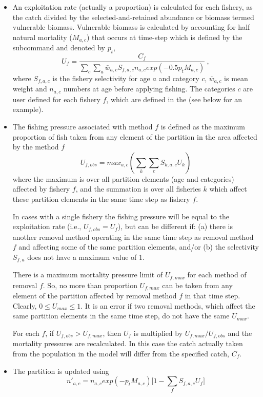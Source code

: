 \begin{itemize}
	\item An exploitation rate (actually a proportion) is calculated for each fishery, as the catch divided by the selected-and-retained abundance or biomass termed vulnerable biomass. Vulnerable biomass is calculated by accounting for half natural mortality (\(M_{a,c}\)) that occurs at time-step which is defined by the subcommand  and denoted by \(p_t\),
	$$U_{f} = \frac{C_f}{\sum\limits_{c}\sum\limits_a \bar{w}_{a,c} S_{f,a,c} n_{a,c} exp(-0.5 p_t M_{a,c})} \ ,$$
	where \(S_{f,a,c}\) is the fishery selectivity for age \(a\) and category \(c\), \(\bar{w}_{a,c}\) is mean weight and \(n_{a,c}\) numbers at age before applying fishing. The categories \(c\) are user defined for each fishery \(f\), which are defined in the  (see below for an example).
	\item The fishing pressure associated with method $f$ is defined as the maximum proportion of fish taken from any element of the partition in the area affected by the method $f$
	$$ U_{f,obs} = max_{a,c}(\sum\limits_k\sum\limits_c S_{k,a,c} U_k) $$
	where the maximum is over all partition elements (age and categories) affected by fishery $f$, and the summation is over all fisheries $k$ which affect these partition elements in the same time step as fishery $f$.

	In cases with a single fishery the fishing pressure will be equal to the exploitation rate (i.e., $U_{f,obs} = U_f$), but can be different if: (a) there is another removal method operating in the same time step as removal method $f$ and affecting some of the same partition elements, and/or (b) the selectivity $S_{f,a}$ does not have a maximum value of 1.

	There is a maximum mortality pressure limit of $U_{f,max}$ for each method of removal $f$. So, no more than proportion $U_{f,max}$ can be taken from any element of the partition affected by removal method $f$ in that time step. Clearly, $0 \leq U_{max} \leq 1$. It is an error if two removal methods, which affect the same partition elements in the same time step, do not have the same $U_{max}$.

	For each $f$, if $U_{f,obs} > U_{f,max}$, then $U_f$ is multiplied by $U_{f,max}/U_{f,obs}$ and the mortality pressures are recalculated. In this case the catch actually taken from the population in the model will differ from the specified catch, $C_f$.

	\item The partition is updated using
		$$ n'_{a,c} = n_{a,c} exp(-p_t M_{a,c})\big[1 - \sum_f S_{f,a,c} U_{f} \big] $$
\end{itemize}

